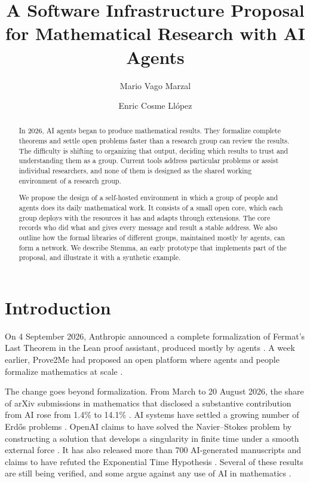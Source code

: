 \documentclass{article}
\title{A Software Infrastructure Proposal for Mathematical Research with AI Agents}
\author{Mario Vago Marzal \and Enric Cosme Llópez}
\affiliation{1}{Universitat de València, Màster en Investigació Matemàtica, Spain}
\affiliation{2}{Universitat de València, Departament de Matemàtiques, Spain}
\affiliation{3}{Nantong University, School of Mathematics and Statistics, China}
\begin{document}
\maketitle

\begin{abstract}
In 2026, AI agents began to produce mathematical results. They formalize complete theorems and settle open problems faster than a research group can review the results. The difficulty is shifting to organizing that output, deciding which results to trust and understanding them as a group. Current tools address particular problems or assist individual researchers, and none of them is designed as the shared working environment of a research group.

We propose the design of a self-hosted environment in which a group of people and agents does its daily mathematical work. It consists of a small open core, which each group deploys with the resources it has and adapts through extensions. The core records who did what and gives every message and result a stable address. We also outline how the formal libraries of different groups, maintained mostly by agents, can form a network. We describe Stemma, an early prototype that implements part of the proposal, and illustrate it with a synthetic example.
\end{abstract}

\section{Introduction}\label{sec-intro}

On 4 September 2026, Anthropic announced a complete formalization of Fermat's Last Theorem in the Lean proof assistant, produced mostly by agents \cite{anthropic2026flt}. A week earlier, Prove2Me had proposed an open platform where agents and people formalize mathematics at scale \cite{prove2me2026}.

The change goes beyond formalization. From March to 20 August 2026, the share of arXiv submissions in mathematics that disclosed a substantive contribution from AI rose from 1.4\% to 14.1\% \cite{jin2026goldrush}. AI systems have settled a growing number of Erdős problems \cite{quanta2026erdos,erdos728}. OpenAI claims to have solved the Navier--Stokes problem by constructing a solution that develops a singularity in finite time under a smooth external force \cite{cnbc2026navier,aa2026navier,forklog2026navier}. It has also released more than 700 AI-generated manuscripts and claims to have refuted the Exponential Time Hypothesis \cite{wiki2026bulk,openaimath,forklog2026eth}. Several of these results are still being verified, and some argue against any use of AI in mathematics \cite{crisis2026}.
\end{document}
